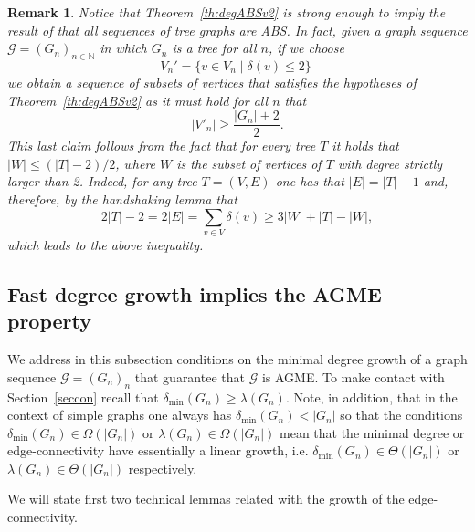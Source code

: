 \documentclass[a4paper,onecolumn,accepted=2024-12-14]{quantumarticle}
\newtheorem{remark}[theorem]{Remark}%
\theoremstyle{plain}
\newcommand{\cG}{{\mathcal G}}         %
\newcommand{\N}{\mathbb{N}} %
\begin{document}
\begin{remark}
Notice that Theorem~\ref{th:degABSv2} is strong enough to imply the result of \cite{ASGME} that all sequences of tree graphs are ABS. In fact, given a graph sequence  $\cG=(G_n)_{n\in\N}$ in which $G_n$ is a tree for all $n$, if we choose
\begin{equation}
 V_n'=\{v\in V_n\mid \delta(v)\leq 2 \}\;
\end{equation}
we obtain a sequence of subsets of vertices that satisfies the hypotheses of Theorem~\ref{th:degABSv2} as it must hold for all $n$ that
\begin{equation}
|V'_n|\geq\frac{|G_n|+2}{2}.
\end{equation}
This last claim follows from the fact that for every tree $T$ it holds that $|W|\leq(|T|-2)/2$, where $W$ is the subset of vertices of $T$ with degree strictly larger than 2. Indeed, for any tree $T=(V,E)$ one has that $|E|=|T|-1$ and, therefore, by the handshaking lemma that
\begin{equation}
2|T|-2=2|E|=\sum_{v\in V}\delta(v)\geq3|W|+|T|-|W|,
\end{equation}
which leads to the above inequality.
\end{remark}



\subsection{Fast degree growth implies the AGME property}\label{subsecdeg2}

We address in this subsection conditions on the minimal degree growth of a graph sequence $\cG=(G_n)_n$ that guarantee
that $\cG$ is AGME. To make contact with Section~\ref{seccon} recall that $\delta_{\mathrm{min}}(G_n)\geq \lambda(G_n)$.
Note, in addition, that in the context of simple graphs one always has $\delta_{\mathrm{min}}(G_n)< |G_n|$ so that the conditions
$\delta_{\mathrm{min}}(G_n)\in\Omega(|G_n|)$ or
$\lambda(G_n)\in\Omega(|G_n|)$ mean that the minimal degree or edge-connectivity
have essentially a linear growth, i.e.
$\delta_{\mathrm{min}}(G_n)\in\Theta(|G_n|)$ or $\lambda(G_n)\in\Theta(|G_n|)$ respectively.


We will state first two technical lemmas related with the growth of the edge-connectivity.
\end{document}
